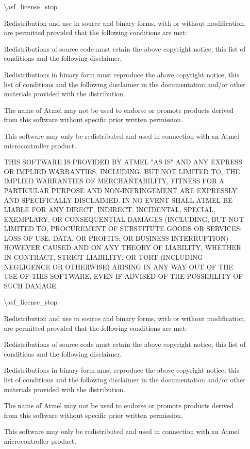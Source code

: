 \textbackslash{}asf\+\_\+license\+\_\+stop

Redistribution and use in source and binary forms, with or without modification, are permitted provided that the following conditions are met:\+


\begin{DoxyEnumerate}
\item Redistributions of source code must retain the above copyright notice, this list of conditions and the following disclaimer.
\item Redistributions in binary form must reproduce the above copyright notice, this list of conditions and the following disclaimer in the documentation and/\+or other materials provided with the distribution.
\item The name of Atmel may not be used to endorse or promote products derived from this software without specific prior written permission.
\item This software may only be redistributed and used in connection with an Atmel microcontroller product.
\end{DoxyEnumerate}

THIS SOFTWARE IS PROVIDED BY ATMEL "{}\+AS IS"{} AND ANY EXPRESS OR IMPLIED WARRANTIES, INCLUDING, BUT NOT LIMITED TO, THE IMPLIED WARRANTIES OF MERCHANTABILITY, FITNESS FOR A PARTICULAR PURPOSE AND NON-\/\+INFRINGEMENT ARE EXPRESSLY AND SPECIFICALLY DISCLAIMED. IN NO EVENT SHALL ATMEL BE LIABLE FOR ANY DIRECT, INDIRECT, INCIDENTAL, SPECIAL, EXEMPLARY, OR CONSEQUENTIAL DAMAGES (INCLUDING, BUT NOT LIMITED TO, PROCUREMENT OF SUBSTITUTE GOODS OR SERVICES; LOSS OF USE, DATA, OR PROFITS; OR BUSINESS INTERRUPTION) HOWEVER CAUSED AND ON ANY THEORY OF LIABILITY, WHETHER IN CONTRACT, STRICT LIABILITY, OR TORT (INCLUDING NEGLIGENCE OR OTHERWISE) ARISING IN ANY WAY OUT OF THE USE OF THIS SOFTWARE, EVEN IF ADVISED OF THE POSSIBILITY OF SUCH DAMAGE.

\textbackslash{}asf\+\_\+license\+\_\+stop

Redistribution and use in source and binary forms, with or without modification, are permitted provided that the following conditions are met:\+


\begin{DoxyEnumerate}
\item Redistributions of source code must retain the above copyright notice, this list of conditions and the following disclaimer.
\item Redistributions in binary form must reproduce the above copyright notice, this list of conditions and the following disclaimer in the documentation and/\+or other materials provided with the distribution.
\item The name of Atmel may not be used to endorse or promote products derived from this software without specific prior written permission.
\item This software may only be redistributed and used in connection with an Atmel microcontroller product.
\end{DoxyEnumerate}

